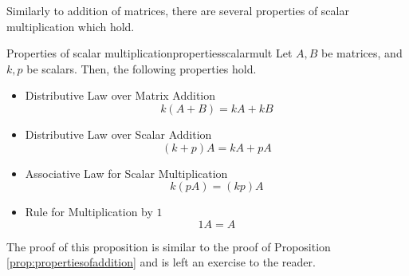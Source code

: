 Similarly to addition of matrices, there are several properties of scalar multiplication which hold.

\begin{proposition}{Properties of scalar multiplication}{propertiesscalarmult}
Let $A, B$ be matrices, and $k, p$ be scalars. Then, the following properties hold.
\begin{itemize}
\item Distributive Law over Matrix Addition
\begin{equation*}
k \left( A+B\right) =k A+ kB  
\end{equation*}

\item Distributive Law over Scalar Addition
\begin{equation*}
\left( k +p \right) A= k A+p A
\end{equation*}

\item Associative Law for Scalar Multiplication
\begin{equation*}
k \left( p A\right) = \left( k p \right) A 
\end{equation*}

\item Rule for Multiplication by $1$
\begin{equation*}
1A=A  
\end{equation*}
\end{itemize}

\end{proposition}

The proof of this proposition is similar to the proof of Proposition \ref{prop:propertiesofaddition} and is left an exercise to the reader.
